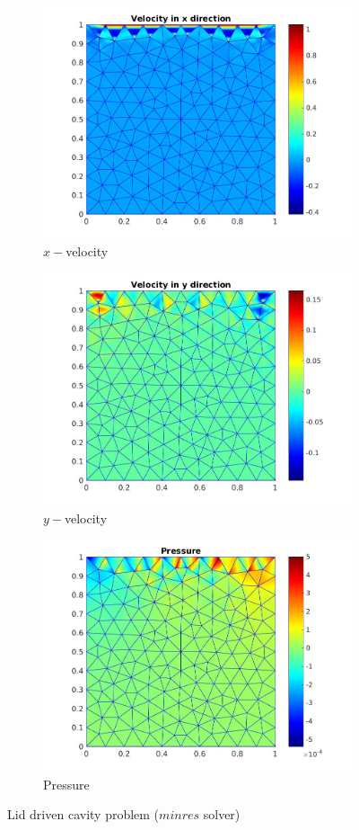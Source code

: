 \documentclass[a4paper,twoside,openright]{book}
\begin{document}
\begin{figure}
\begin{subfigure}{\textwidth}	
  \includegraphics[width=0.8\linewidth]{lid_minres_vx.jpg}
  \caption{$x-$velocity} 
  \label{x_vel_stoke_minres_lid}
\end{subfigure}
\begin{subfigure}{\textwidth}	
  \includegraphics[width=0.8\linewidth]{lid_minres_vy.jpg}
  \caption{$y-$velocity} 
  \label{y_vel_stoke_minres_lid}
\end{subfigure}
\begin{subfigure}{\textwidth}	
  \includegraphics[width=0.8\linewidth]{lid_minres_pressure.jpg}
  \caption{Pressure} 
  \label{pressure_stoke_minres_lid}
\end{subfigure}
\caption{Lid driven cavity problem ($minres$ solver)}
\label{stoke_minres_lid}
\end{figure}
\end{document}

